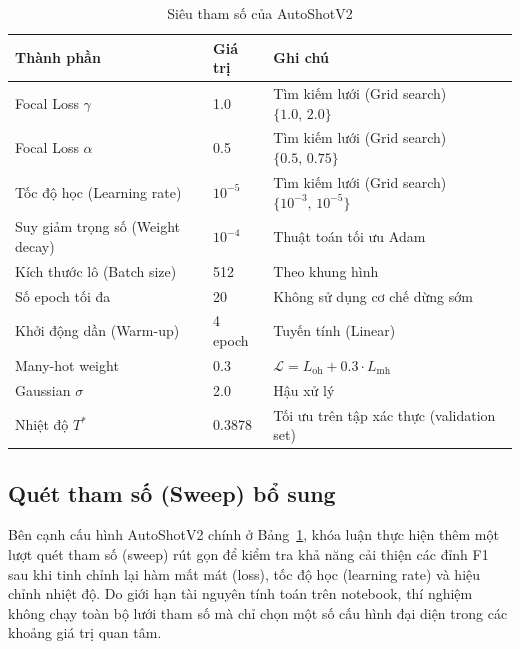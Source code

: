 \begin{table}[H]
\centering
\caption{Siêu tham số của AutoShotV2}
\label{tab:autoshotv2_config}
\begin{tabular}{llp{4.5cm}}
\toprule
\textbf{Thành phần} & \textbf{Giá trị} & \textbf{Ghi chú} \\
\midrule
Focal Loss $\gamma$ & 1.0 & Tìm kiếm lưới (Grid search) $\{1.0,\,2.0\}$ \\
Focal Loss $\alpha$ & 0.5 & Tìm kiếm lưới (Grid search) $\{0.5,\,0.75\}$ \\
Tốc độ học (Learning rate) & $10^{-5}$ & Tìm kiếm lưới (Grid search) $\{10^{-3},\,10^{-5}\}$ \\
Suy giảm trọng số (Weight decay) & $10^{-4}$ & Thuật toán tối ưu Adam \\
Kích thước lô (Batch size) & 512 & Theo khung hình \\
Số epoch tối đa & 20 & Không sử dụng cơ chế dừng sớm \\
Khởi động dần (Warm-up) & 4 epoch & Tuyến tính (Linear) \\
Many-hot weight & 0.3 & $\mathcal{L} = L_{\text{oh}} + 0.3 \cdot L_{\text{mh}}$ \\
Gaussian $\sigma$ & 2.0 & Hậu xử lý \\
Nhiệt độ $T^*$ & 0.3878 & Tối ưu trên tập xác thực (validation set) \\
\bottomrule
\end{tabular}
\end{table}

\subsection{Quét tham số (Sweep) bổ sung}

Bên cạnh cấu hình AutoShotV2 chính ở Bảng~\ref{tab:autoshotv2_config}, khóa luận thực hiện thêm một lượt quét tham số (sweep) rút gọn để kiểm tra khả năng cải thiện các đỉnh F1 sau khi tinh chỉnh lại hàm mất mát (loss), tốc độ học (learning rate) và hiệu chỉnh nhiệt độ. Do giới hạn tài nguyên tính toán trên notebook, thí nghiệm không chạy toàn bộ lưới tham số mà chỉ chọn một số cấu hình đại diện trong các khoảng giá trị quan tâm.

